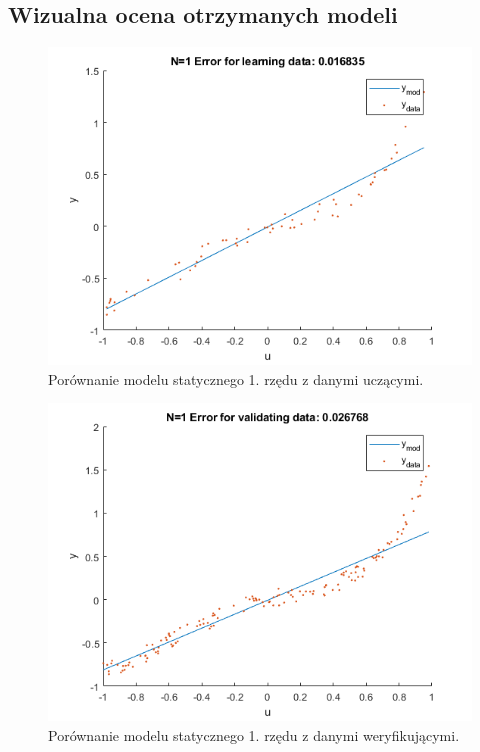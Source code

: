 \subsection{Wizualna ocena otrzymanych modeli}
\begin{figure}[H]
\centering
\includegraphics[width=15cm]{images/s1.png}
\caption{Porównanie modelu statycznego 1. rzędu z danymi uczącymi.}
\label{fig:s1}
\end{figure}
\begin{figure}[H]
\centering
\includegraphics[width=15cm]{images/s2.png}
\caption{Porównanie modelu statycznego 1. rzędu z danymi weryfikującymi.}
\label{fig:s2}
\end{figure}
